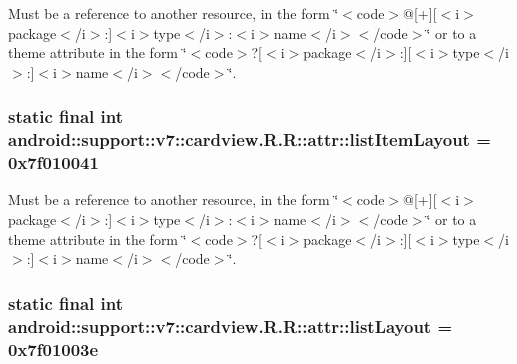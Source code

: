 Must be a reference to another resource, in the form \char`\"{}$<$code$>$@\mbox{[}+\mbox{]}\mbox{[}$<$i$>$package$<$/i$>$:\mbox{]}$<$i$>$type$<$/i$>$:$<$i$>$name$<$/i$>$$<$/code$>$\char`\"{} or to a theme attribute in the form \char`\"{}$<$code$>$?\mbox{[}$<$i$>$package$<$/i$>$:\mbox{]}\mbox{[}$<$i$>$type$<$/i$>$:\mbox{]}$<$i$>$name$<$/i$>$$<$/code$>$\char`\"{}. \hypertarget{classandroid_1_1support_1_1v7_1_1cardview_1_1_r_1_1attr_9778664dc34f4fa3e9c6574fc2bab0b3}{
\subsubsection[{listItemLayout}]{\setlength{\rightskip}{0pt plus 5cm}static final int android::support::v7::cardview.R.R::attr::listItemLayout = 0x7f010041}}
\label{classandroid_1_1support_1_1v7_1_1cardview_1_1_r_1_1attr_9778664dc34f4fa3e9c6574fc2bab0b3}


Must be a reference to another resource, in the form \char`\"{}$<$code$>$@\mbox{[}+\mbox{]}\mbox{[}$<$i$>$package$<$/i$>$:\mbox{]}$<$i$>$type$<$/i$>$:$<$i$>$name$<$/i$>$$<$/code$>$\char`\"{} or to a theme attribute in the form \char`\"{}$<$code$>$?\mbox{[}$<$i$>$package$<$/i$>$:\mbox{]}\mbox{[}$<$i$>$type$<$/i$>$:\mbox{]}$<$i$>$name$<$/i$>$$<$/code$>$\char`\"{}. \hypertarget{classandroid_1_1support_1_1v7_1_1cardview_1_1_r_1_1attr_aa7578f4d075c8bdfe762a8ce13b1715}{
\subsubsection[{listLayout}]{\setlength{\rightskip}{0pt plus 5cm}static final int android::support::v7::cardview.R.R::attr::listLayout = 0x7f01003e}}
\label{classandroid_1_1support_1_1v7_1_1cardview_1_1_r_1_1attr_aa7578f4d075c8bdfe762a8ce13b1715}


